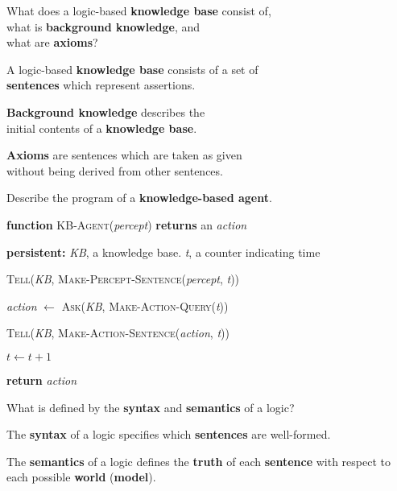 
\begin{flashcard}[Question]{What does a logic-based \textbf{knowledge base} consist of,\\what is \textbf{background knowledge}, and\\what are \textbf{axioms}?}
\begin{center}
A logic-based \textbf{knowledge base} consists of a set of\\\textbf{sentences} which represent assertions.

\medskip

\textbf{Background knowledge} describes the\\initial contents of a \textbf{knowledge base}.

\medskip

\textbf{Axioms} are sentences which are taken as given\\without being derived from other sentences.
\end{center}
\end{flashcard}

\begin{flashcard}[Question]{Describe the program of a \textbf{knowledge-based agent}.}
\begin{center}
\begin{minipage}{0.9\textwidth}
\textbf{function} \textsc{KB-Agent}(\textit{percept}) \textbf{returns} an \textit{action}

\quad \textbf{persistent:} \textit{KB}, a knowledge base. \textit{t}, a counter indicating time

\quad \textsc{Tell}(\textit{KB}, \textsc{Make-Percept-Sentence}(\textit{percept}, \textit{t}))

\quad \textit{action} $\leftarrow$ \textsc{Ask}(\textit{KB}, \textsc{Make-Action-Query}(\textit{t}))

\quad \textsc{Tell}(\textit{KB}, \textsc{Make-Action-Sentence}(\textit{action}, \textit{t}))

\quad $t \leftarrow t + 1$

\quad \textbf{return} \textit{action}

\end{minipage}
\end{center}
\end{flashcard}

\begin{flashcard}[Question]{What is defined by the \textbf{syntax} and \textbf{semantics} of a logic?}
\begin{center}
The \textbf{syntax} of a logic specifies which \textbf{sentences} are well-formed.

\medskip

The \textbf{semantics} of a logic defines the \textbf{truth} of each \textbf{sentence} with respect to each possible \textbf{world} (\textbf{model}).
\end{center}
\end{flashcard}


